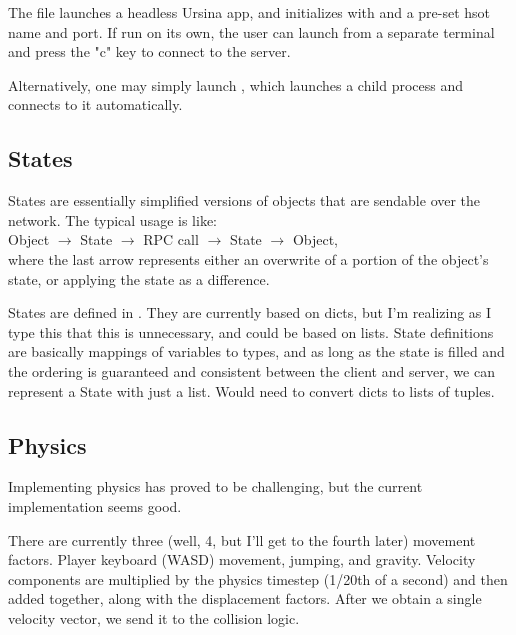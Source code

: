 \documentclass{article}
\begin{document}
The file  launches a headless Ursina app, and initializes
 with  and a pre-set hsot name and port.
If run on its own, the user can launch  from a separate
terminal and press the "c" key to connect to the server.

Alternatively, one may simply launch , which launches a child
 process and connects to it automatically.

\subsection{States}
States are essentially simplified versions of objects that are sendable over
the network. The typical usage is like:\\
Object $\rightarrow$ State $\rightarrow$ RPC call $\rightarrow$ State
$\rightarrow$ Object,\\
where the last arrow represents either an overwrite of a portion of the object's state,
or applying the state as a difference.

States are defined in . They are currently based on dicts,
but I'm realizing as I type this that this is unnecessary, and could be based on
lists. State definitions are basically mappings of variables to types, and as long as
the state is filled and the ordering is guaranteed and consistent between the
client and server, we can represent a State with just a list. Would need to convert
dicts to lists of tuples.
\subsection{Physics}
Implementing physics has proved to be challenging, but the current implementation seems
good.

There are currently three (well, 4, but I'll get to the fourth later) movement
factors. Player keyboard (WASD) movement, jumping, and gravity. Velocity
components are multiplied by the physics timestep (1/20th of a second) and then
added together, along with the displacement factors. After we obtain a single
velocity vector, we send it to the collision logic.
\end{document}
